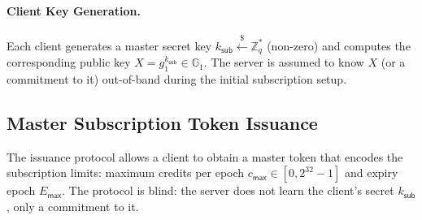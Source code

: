 \documentclass[11pt]{article}
\theoremstyle{definitionstyle}
\theoremstyle{plain}
\begin{document}
\paragraph{Client Key Generation.}
Each client generates a master secret key $k_{\mathsf{sub}} \xleftarrow{\$} \mathbb{Z}_q^*$ (non-zero) and computes the corresponding public key $X = g_1^{k_{\mathsf{sub}}} \in \mathbb{G}_1$. The server is assumed to know $X$ (or a commitment to it) out-of-band during the initial subscription setup.

\subsection{Master Subscription Token Issuance}
The issuance protocol allows a client to obtain a master token that encodes the subscription limits: maximum credits per epoch $c_{\mathsf{max}} \in [0, 2^{32}-1]$ and expiry epoch $E_{\mathsf{max}}$. The protocol is blind: the server does not learn the client's secret $k_{\mathsf{sub}}$, only a commitment to it.
\end{document}
